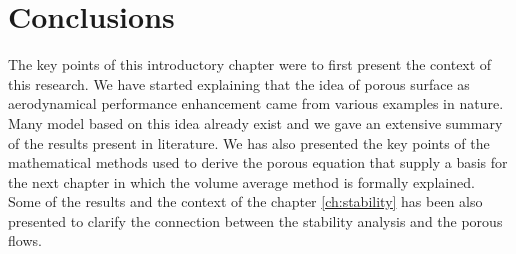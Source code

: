 \section{Conclusions}
The key points of this introductory chapter were to first present the context of this research. We have started explaining that the idea of porous surface as aerodynamical performance enhancement came from various examples in nature.
Many model based on this idea already exist and we gave an extensive summary of the results present in literature. We has also presented the key points of the mathematical methods used to derive the porous equation that supply a basis for the next chapter in which the volume average method is formally explained.
Some of the results and the context of the chapter \ref{ch:stability} has been also presented to clarify the connection between the stability analysis and the porous flows.